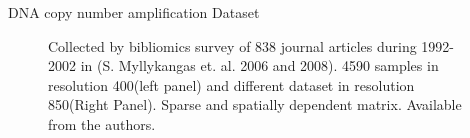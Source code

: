 \documentclass[dvips]{beamer}
\begin{document}
\begin{frame}{DNA copy number amplification Dataset}
\begin{figure}[h!]
  \centering
  \caption{Collected by bibliomics survey of 838 journal articles during 1992-2002 in (S. Myllykangas et. al. 2006 and 2008). 4590 samples in resolution 400(left panel) and different dataset in resolution 850(Right Panel). Sparse and spatially dependent matrix. Available from the authors.}
  \label{Fig:converge}
\end{figure}
\end {frame}
\end{document}
